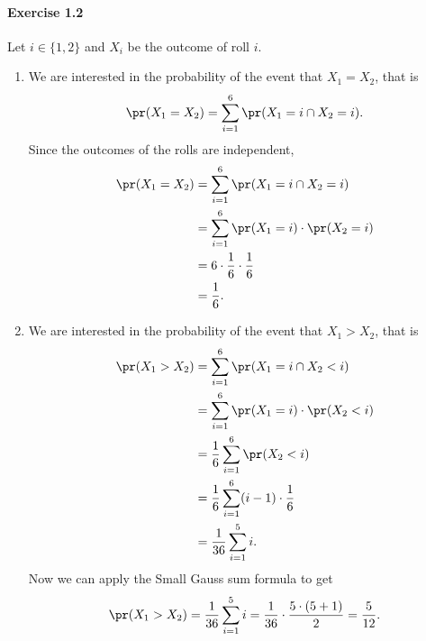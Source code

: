 \paragraph{Exercise 1.2} Let $i \in \{ 1,2 \}$ and $X_i$ be the outcome of roll $i$.
\begin{enumerate}
  \item[(a)] We are interested in the probability of the event that $X_1 = X_2$,
    that is
    \[
      \pr(X_1 = X_2) = \sum_{i=1}^6 \pr(X_1 = i \cap X_2 = i).
    \]
    Since the outcomes of the rolls are independent,
    \begin{align*}
      \pr(X_1 = X_2)  &= \sum_{i=1}^6 \pr(X_1 = i \cap X_2 = i) \\
                      &= \sum_{i=1}^6 \pr(X_1 = i) \cdot \pr(X_2 = i) \\
                      &= 6 \cdot \frac{1}{6} \cdot \frac{1}{6} \\
                      &= \frac{1}{6}.
    \end{align*}

  \item[(b)] We are interested in the probability of the event that $X_1 > X_2$,
    that is
    \begin{align*}
      \pr(X_1 > X_2)  &= \sum_{i=1}^6 \pr(X_1 = i \cap X_2 < i) \\
                      &= \sum_{i=1}^6 \pr(X_1 = i) \cdot \pr(X_2 < i) \\
                      &= \frac{1}{6} \sum_{i=1}^6 \pr(X_2 < i) \\
                      &= \frac{1}{6} \sum_{i=1}^6 (i-1) \cdot \frac{1}{6} \\
                      &= \frac{1}{36} \sum_{i=1}^5 i.
    \end{align*}
    Now we can apply the Small Gauss sum formula to get
    \[
      \pr(X_1 > X_2) = \frac{1}{36} \sum_{i=1}^5 i
        = \frac{1}{36} \cdot \frac{5 \cdot (5 + 1)}{2}
        = \frac{5}{12}.
    \]


\end{enumerate}
